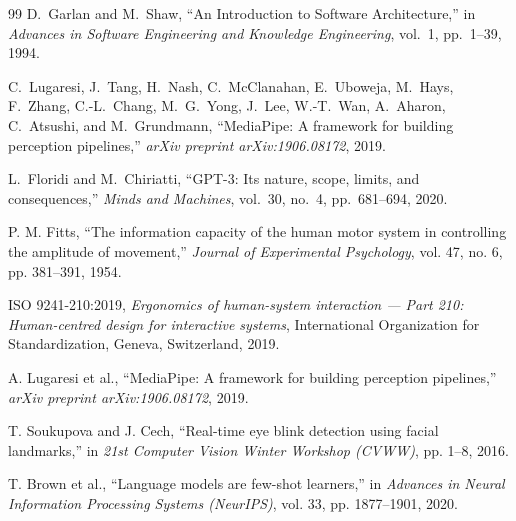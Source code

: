\documentclass[twoside, a4paper, 11pt]{article}
\begin{document}
\begin{thebibliography}{99}
D.~Garlan and M.~Shaw, ``An Introduction to Software Architecture,'' in \emph{Advances in Software Engineering and Knowledge Engineering}, vol.~1, pp.~1--39, 1994.

C.~Lugaresi, J.~Tang, H.~Nash, C.~McClanahan, E.~Uboweja, M.~Hays, F.~Zhang, C.-L.~Chang, M.~G.~Yong, J.~Lee, W.-T.~Wan, A.~Aharon, C.~Atsushi, and M.~Grundmann, ``MediaPipe: A framework for building perception pipelines,'' \emph{arXiv preprint arXiv:1906.08172}, 2019.

L.~Floridi and M.~Chiriatti, ``GPT-3: Its nature, scope, limits, and consequences,'' \emph{Minds and Machines}, vol.~30, no.~4, pp.~681--694, 2020.

P. M. Fitts, ``The information capacity of the human motor system in controlling the amplitude of movement,'' \emph{Journal of Experimental Psychology}, vol. 47, no. 6, pp. 381--391, 1954.

ISO 9241-210:2019, 
\emph{Ergonomics of human-system interaction — Part 210: Human-centred design for interactive systems}, 
International Organization for Standardization, Geneva, Switzerland, 2019.

A. Lugaresi et al., 
``MediaPipe: A framework for building perception pipelines,'' 
\emph{arXiv preprint arXiv:1906.08172}, 2019.

T. Soukupova and J. Cech, 
``Real-time eye blink detection using facial landmarks,'' 
in \emph{21st Computer Vision Winter Workshop (CVWW)}, pp. 1--8, 2016.

T. Brown et al., 
``Language models are few-shot learners,'' 
in \emph{Advances in Neural Information Processing Systems (NeurIPS)}, vol. 33, pp. 1877--1901, 2020.




\end{thebibliography}
\end{document}
